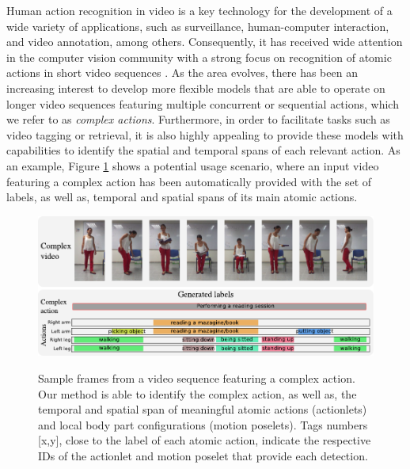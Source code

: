 Human action recognition in video is a key technology for the development of a
wide variety of applications, such as surveillance, human-computer interaction,
and video annotation, among others. Consequently, it has received wide attention
in the computer vision community with a strong focus on recognition of atomic
actions in short video sequences
\cite{Aggarwal2011,vishwakarma2013survey,weinland2011survey}. As the area
evolves, there has been an increasing interest to develop more
flexible models that are able to operate on longer video sequences featuring
multiple concurrent or sequential actions, which we refer to as
\textit{complex actions}. Furthermore, in order to facilitate tasks such as
video tagging or retrieval, it is also highly appealing to provide these models
with capabilities to identify the spatial and temporal spans of each relevant
action. As an example, Figure \ref{fig:frontfigure} shows a potential usage
scenario, where an input video featuring a complex action has been automatically
provided with the set of labels, as well as, temporal and
spatial spans of its main atomic actions.

\begin{figure}[t]
\begin{center} \label{fig:frontfigure}
\includegraphics[width=0.98\linewidth]{Fig/portada.pdf}
\vspace{-0.5cm}
\end{center}
\caption{Sample frames from a video sequence featuring a complex action. 
Our method is able to identify the complex action, as well as, the temporal and 
spatial span of meaningful atomic actions (actionlets) and local body part 
configurations (motion poselets). Tags numbers [x,y], close to the label of 
each atomic action, indicate the respective IDs of the actionlet and motion 
poselet that provide each detection.}
\vspace{-0.5cm}
\end{figure}

